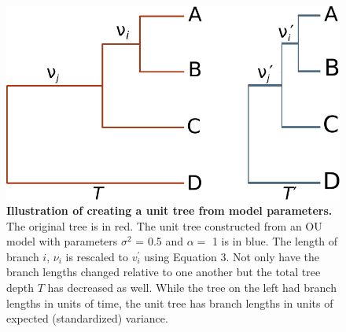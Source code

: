 \documentclass[a4paper,12pt]{article}
\begin{document}
\begin{figure}[p]
  \centering
  \includegraphics{figs/unit-tree}
  \caption{\textbf{Illustration of creating a unit tree from model parameters.} The original tree is in red. The unit tree constructed from an OU model with parameters $\sigma^2$ = 0.5 and $\alpha=$ 1 is in blue. The length of branch $i$, $\nu_i$ is rescaled to $v_i^\prime$ using Equation 3. Not only have the branch lengths changed relative to one another but the total tree depth $T$ has decreased as well. While the tree on the left had branch lengths in units of time, the unit tree has branch lengths in units of expected (standardized) variance.}
  \label{fig:box1}
\end{figure}

\renewcommand\thefigure{S\arabic{figure}}
\renewcommand\thetable{S \arabic{table}}
\setcounter{figure}{0}    
\setcounter{table}{0} 
\end{document}
